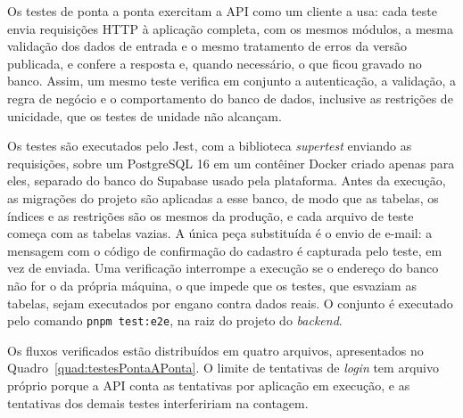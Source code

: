 Os testes de ponta a ponta exercitam a API como um cliente a usa: cada teste envia requisições HTTP à aplicação completa, com os mesmos módulos, a mesma validação dos dados de entrada e o mesmo tratamento de erros da versão publicada, e confere a resposta e, quando necessário, o que ficou gravado no banco. Assim, um mesmo teste verifica em conjunto a autenticação, a validação, a regra de negócio e o comportamento do banco de dados, inclusive as restrições de unicidade, que os testes de unidade não alcançam.

Os testes são executados pelo Jest, com a biblioteca \textit{supertest} enviando as requisições, sobre um PostgreSQL 16 em um contêiner Docker criado apenas para eles, separado do banco do Supabase usado pela plataforma. Antes da execução, as migrações do projeto são aplicadas a esse banco, de modo que as tabelas, os índices e as restrições são os mesmos da produção, e cada arquivo de teste começa com as tabelas vazias. A única peça substituída é o envio de e-mail: a mensagem com o código de confirmação do cadastro é capturada pelo teste, em vez de enviada. Uma verificação interrompe a execução se o endereço do banco não for o da própria máquina, o que impede que os testes, que esvaziam as tabelas, sejam executados por engano contra dados reais. O conjunto é executado pelo comando \texttt{pnpm test:e2e}, na raiz do projeto do \textit{backend}.

Os fluxos verificados estão distribuídos em quatro arquivos, apresentados no Quadro~\ref{quad:testesPontaAPonta}. O limite de tentativas de \textit{login} tem arquivo próprio porque a API conta as tentativas por aplicação em execução, e as tentativas dos demais testes interfeririam na contagem.

